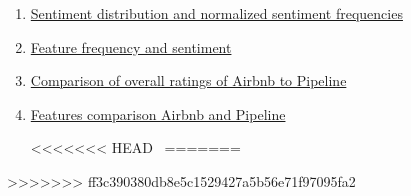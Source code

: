 \begin{enumerate}

\item \href{https://github.com/AntigoniKourou/Thesis/blob/162bfcf814ff96f8729bd033a7eb9813e89ca454/Sentiment\%20distribution\%20and\%20normalized\%20sentiment\%20frequencies\%20.ipynb}{Sentiment distribution and normalized sentiment frequencies}

\item \href{https://github.com/AntigoniKourou/Thesis/blob/162bfcf814ff96f8729bd033a7eb9813e89ca454/Feature frequency and sentiment.ipynb}{Feature frequency and sentiment}

\item \href{https://github.com/AntigoniKourou/Thesis/blob/162bfcf814ff96f8729bd033a7eb9813e89ca454/Comparison\%20of\%20overall\%20ratings\%20of\%20Airbnb\%20to\%20Pipeline.ipynb}{Comparison of overall ratings of Airbnb to Pipeline} 

\item \href{https://github.com/AntigoniKourou/Thesis/blob/162bfcf814ff96f8729bd033a7eb9813e89ca454/Features\%20comparison\%20Airbnb\%20and\%20Pipeline.ipynb}{Features comparison Airbnb and Pipeline}

<<<<<<< HEAD
\
=======
\end{enumerate}




>>>>>>> ff3c390380db8e5c1529427a5b56e71f97095fa2
